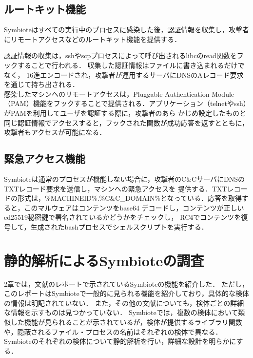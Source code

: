\documentclass[submit,techreq,noauthor]{eco}	%
\begin{document}
\subsection{ルートキット機能}
Symbioteはすべての実行中のプロセスに感染した後，認証情報を収集し，攻撃者にリモートアクセスなどのルートキット機能を提供する．

認証情報の収集は，sshやscpプロセスによって呼び出されるlibcのread関数をフックすることで行われる．
収集した認証情報はファイルに書き込まれるだけでなく，
16進エンコードされ，攻撃者が運用するサーバにDNSのAレコード要求を通じて持ち出される．\\
\indent
感染したマシンへのリモートアクセスは，Pluggable Authentication
Module（PAM）機能をフックすることで提供される．アプリケーション（telnetやssh）がPAMを利用してユーザを認証する際に，攻撃者のあら
かじめ設定したものと同じ認証情報でアクセスすると，フックされた関数が成功応答を返すとともに，攻撃者もアクセスが可能になる．

\subsection{緊急アクセス機能}
Symbioteは通常のプロセスが機能しない場合に，攻撃者のC\&CサーバにDNSのTXTレコード要求を送信し，マシンへの緊急アクセスを
提供する．TXTレコードの形式は，\%MACHINEID\%.\%C\&C\_DOMAIN\%となっている．応答を取得すると，このマルウェアはコンテンツをbase64
デコードし，コンテンツが正しいed25519秘密鍵で署名されているかどうかをチェックし，
RC4でコンテンツを復号して，生成されたbashプロセスでシェルスクリプトを実行する．\\


\section{静的解析によるSymbioteの調査}
2章では，文献\cite{Symbiote}のレポートで示されているSymbioteの機能を紹介した．
ただし，このレポートはSymbioteで一般的に見られる機能を紹介しており，具体的な検体の情報は明記されていない．
また，その他の文献についても，検体ごとの詳細な情報を示すものは見つかっていない．
\indent
Symbioteでは，複数の検体において類似した機能が見られることが示されているが，検体が提供するライブラリ関数や，隠蔽されるファイル・プロセスの名前はそれぞれの検体で異なる．
Symbioteのそれぞれの検体について静的解析を行い，詳細な設計を明らかにする．
\end{document}
